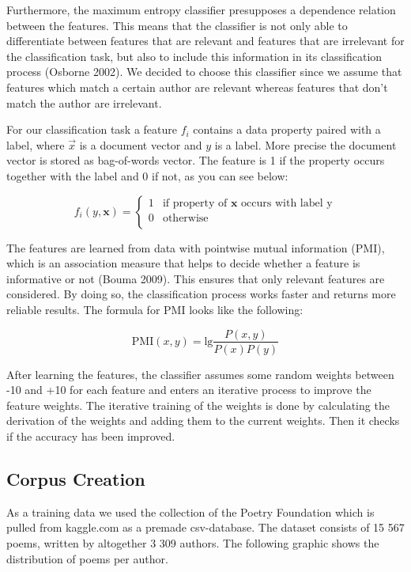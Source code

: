 \documentclass[11pt]{article}
\begin{document}
Furthermore, the maximum entropy classifier presupposes a dependence relation between the features. This means that the classifier is not only able to differentiate between features that are relevant and features that are irrelevant for the classification task, but also to include this information in its classification process (Osborne 2002).
We decided to choose this classifier since we assume that features which match a certain author are relevant whereas features that don't match the author are irrelevant.

For our classification task a feature $f_{i}$ contains a data property paired with a label, where $\vec{x}$ is a document vector and $y$ is a label. More precise the document vector is stored as bag-of-words vector. The feature is 1 if the property occurs together with the label and 0 if not, as you can see below:

\[f_{i}(y,\pmb{x})=\begin{cases}
1& \text{if property of }\pmb{x} \text{ occurs with label y}\\
0& \text{otherwise} \\
\end{cases}\]

The features are learned from data with pointwise mutual information (PMI), which is an association measure that helps to decide whether a feature is informative or not (Bouma 2009). This ensures that only relevant features are considered. By doing so, the classification process works faster and returns more reliable results. The formula for PMI looks like the following:

\[\text{PMI}(x,y)=\text{lg}\frac{P(x,y)}{P(x)P(y)}\]

After learning the features, the classifier assumes some random weights between -10 and +10 for each feature and enters an iterative process to improve the feature weights. The iterative training of the weights is done by calculating the derivation of the weights and adding them to the current weights. Then it checks if the accuracy has been improved. 


\subsection{Corpus Creation}
As a training data we used the collection of the Poetry Foundation which is pulled from kaggle.com as a premade csv-database. The dataset consists of 15 567 poems, written by altogether 3 309 authors. The following graphic shows the distribution of poems per author. \\
\end{document}
